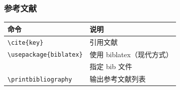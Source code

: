 \subsubsection{参考文献}

\begin{center}
\begin{tabular}{ll}
\toprule
命令 & 说明 \\
\midrule
\verb|\cite{key}| & 引用文献 \\
\verb|\usepackage{biblatex}| & 使用 biblatex（现代方式） \\
\verb|| & 指定 bib 文件 \\
\verb|\printbibliography| & 输出参考文献列表 \\
\bottomrule
\end{tabular}
\end{center}
